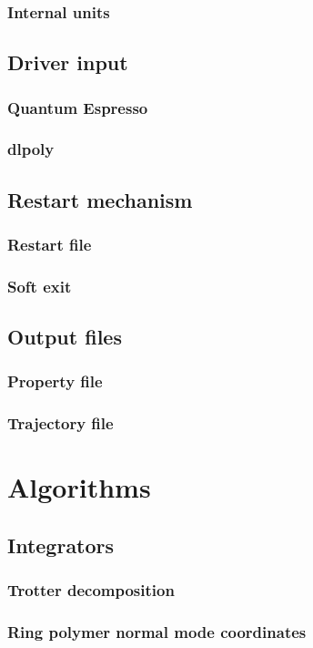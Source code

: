 \documentclass[12pt,fleqn]{report}
\begin{document}
\subsection{Internal units}
\section{Driver input}
\subsection{Quantum Espresso}
\subsection{dlpoly}
\section{Restart mechanism}
\subsection{Restart file}
\subsection{Soft exit}
\section{Output files}
\subsection{Property file}
\subsection{Trajectory file}

\chapter{Algorithms}
\section{Integrators}
\subsection{Trotter decomposition}
\subsection{Ring polymer normal mode coordinates}
\end{document}
